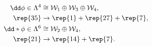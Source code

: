\begin{equation}
\begin{aligned}
   \dd \phi \in \Lambda^4 
      &\cong \mathcal{W}_1 \oplus \mathcal{W}_3 \oplus \mathcal{W}_4 , \\
   \rep{35} &\to \rep{1}+ \rep{27} + \rep{7}  , \\
   \dd * \phi \in \Lambda^6 
      &\cong \mathcal{W}_2 \oplus \mathcal{W}_4 , \\
   \rep{21} &\to \rep{14} + \rep{7} .
\end{aligned}
\end{equation}

